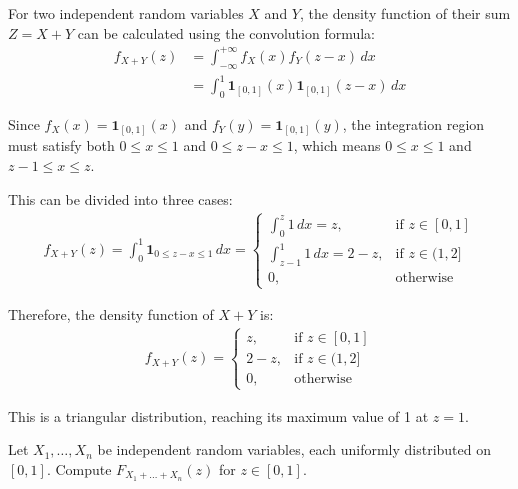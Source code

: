     \begin{solution}
        For two independent random variables $X$ and $Y$, the density function of their sum $Z=X+Y$ can be calculated using the convolution formula:
\begin{align*}
f_{X+Y}(z) &= \int_{-\infty}^{+\infty} f_X(x)f_Y(z-x) \, dx\\
&= \int_{0}^{1} \mathbf{1}_{[0,1]}(x)\mathbf{1}_{[0,1]}(z-x) \, dx
\end{align*}

Since $f_X(x) = \mathbf{1}_{[0,1]}(x)$ and $f_Y(y) = \mathbf{1}_{[0,1]}(y)$, the integration region must satisfy both $0 \leq x \leq 1$ and $0 \leq z-x \leq 1$, which means $0 \leq x \leq 1$ and $z-1 \leq x \leq z$.

This can be divided into three cases:
\begin{align*}
f_{X+Y}(z) = \int_{0}^{1} \mathbf{1}_{0 \leq z-x \leq 1} \, dx = 
\begin{cases}
\int_{0}^{z} 1 \, dx = z, & \text{if } z \in [0,1]\\
\int_{z-1}^{1} 1 \, dx = 2-z, & \text{if } z \in (1,2]\\
0, & \text{otherwise}
\end{cases}
\end{align*}

Therefore, the density function of $X+Y$ is:
\begin{align*}
f_{X+Y}(z) = 
\begin{cases}
z, & \text{if } z \in [0,1]\\
2-z, & \text{if } z \in (1,2]\\
0, & \text{otherwise}
\end{cases}
\end{align*}

This is a triangular distribution, reaching its maximum value of 1 at $z=1$.

    \end{solution}
    
    \begin{problem}[]
    Let $X_1, \ldots, X_n$ be independent random variables, each uniformly distributed on $[0,1]$. Compute $F_{X_1+\ldots+X_n}(z)$ for $z \in [0,1]$.
    \end{problem}
    
